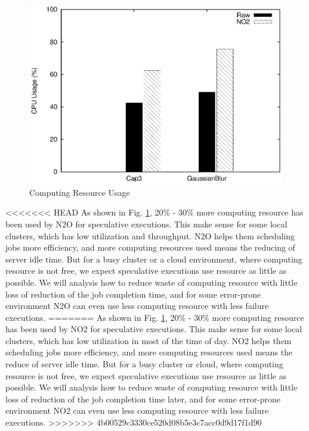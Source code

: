 \begin{figure}
\centering
\includegraphics[width=0.9\columnwidth]{figures/resource_usage.eps}
\caption{Computing Resource Usage}
\label{figure:resourceusage}
\end{figure}

<<<<<<< HEAD
As shown in Fig.  \ref{figure:resourceusage}, 20\% - 30\% more computing resource has been used by N2O for speculative executions. This make sense for some local clusters, which has low utilization and throughput. N2O helps them scheduling jobs more efficiency, and more computing resources used means the reducing of server idle time. But for a busy cluster or a cloud environment, where computing resource is not free, we expect speculative executions use resource as little as possible. We will analysis how to reduce waste of computing resource with little loss of reduction of the job completion time, and for some error-prone environment N2O can even use less computing resource with less failure executions.
=======
As shown in Fig.  \ref{figure:resourceusage}, 20\% - 30\% more computing resource has been used by NO2 for speculative executions. This make sense for some local clusters, which has low utilization in most of the time of day. NO2 helps them scheduling jobs more efficiency, and more computing resources used means the reduce of server idle time. But for a busy cluster or cloud, where computing resource is not free, we expect speculative executions use resource as little as possible. We will analysis how to reduce waste of computing resource with little loss of reduction of the job completion time later, and for some error-prone environment NO2 can even use less computing resource with less failure executions.
>>>>>>> 4b00529c3330ce520d08b5e3c7acc0d9d17f1d90

